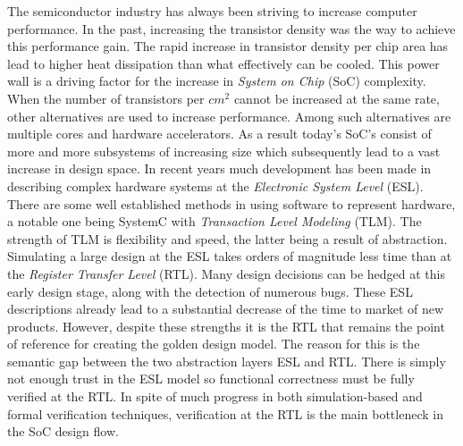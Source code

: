 The semiconductor industry has always been striving to increase computer performance. In the past, increasing the transistor density was the way to achieve this performance gain. The rapid increase in transistor density per chip area has lead to higher heat dissipation than what effectively can be cooled. This power wall is a driving factor for the increase in \textit{System on Chip} (SoC) complexity. When the number of transistors per $cm^2$ cannot be increased at the same rate, other alternatives are used to increase performance. Among such alternatives are multiple cores and hardware accelerators. As a result today's SoC's consist of more and more subsystems of increasing size which subsequently lead to a vast increase in design space. In recent years much development has been made in describing complex hardware systems at the \textit{Electronic System Level} (ESL). There are some well established methods in using software to represent hardware, a notable one being SystemC with \textit{Transaction Level Modeling} (TLM). The strength of TLM is flexibility and speed, the latter being a result of abstraction. Simulating a large design at the ESL takes orders of magnitude less time than at the \textit{Register Transfer Level} (RTL). Many design decisions can be hedged at this early design stage, along with the detection of numerous bugs. These ESL descriptions already lead to a substantial decrease of the time to market of new products. However, despite these strengths it is the RTL that remains the point of reference for creating the golden design model. The reason for this is the semantic gap between the two abstraction layers ESL and RTL. There is simply not enough trust in the ESL model so functional correctness must be fully verified at the RTL. In spite of much progress in both simulation-based and formal verification techniques, verification at the RTL is the main bottleneck in the SoC design flow. \par

